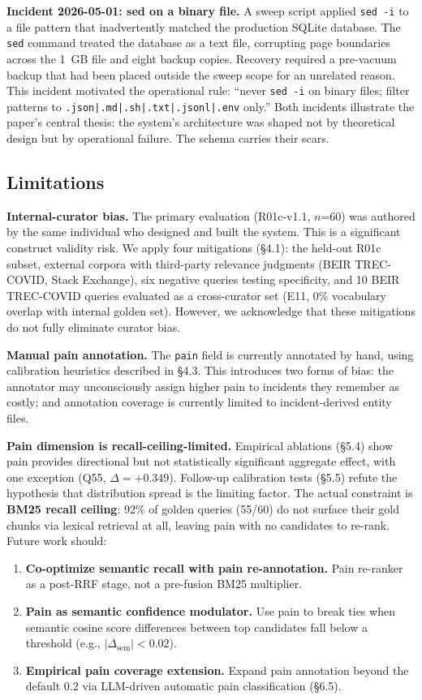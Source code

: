 \textbf{Incident 2026-05-01: sed on a binary file.} A sweep script applied
\texttt{sed~-i} to a file pattern that inadvertently matched the production SQLite
database. The \texttt{sed} command treated the database as a text file, corrupting page
boundaries across the 1~GB file and eight backup copies. Recovery required a pre-vacuum
backup that had been placed outside the sweep scope for an unrelated reason. This incident
motivated the operational rule: ``never \texttt{sed~-i} on binary files; filter patterns
to \texttt{.json|.md|.sh|.txt|.jsonl|.env} only.'' Both incidents illustrate the paper's
central thesis: the system's architecture was shaped not by theoretical design but by
operational failure. The schema carries their scars.

\subsection{Limitations}

\textbf{Internal-curator bias.} The primary evaluation (R01c-v1.1, $n$=60) was authored by the
same individual who designed and built the system. This is a significant construct validity
risk. We apply four mitigations (\S4.1): the held-out R01c subset, external corpora with
third-party relevance judgments (BEIR TREC-COVID, Stack Exchange), six negative queries
testing specificity, and 10 BEIR TREC-COVID queries evaluated as a cross-curator set (E11,
0\% vocabulary overlap with internal golden set). However, we acknowledge that these
mitigations do not fully eliminate curator bias.

\textbf{Manual pain annotation.} The \texttt{pain} field is currently annotated by hand,
using calibration heuristics described in \S4.3. This introduces two forms of bias: the
annotator may unconsciously assign higher pain to incidents they remember as costly; and
annotation coverage is currently limited to incident-derived entity files.

\textbf{Pain dimension is recall-ceiling-limited.} Empirical ablations (\S5.4) show pain
provides directional but not statistically significant aggregate effect, with one exception
(Q55, $\Delta=+0.349$). Follow-up calibration tests (\S5.5) refute the hypothesis that
distribution spread is the limiting factor. The actual constraint is \textbf{BM25 recall
ceiling}: 92\% of golden queries (55/60) do not surface their gold chunks via lexical
retrieval at all, leaving pain with no candidates to re-rank. Future work should:

\begin{enumerate}
  \item \textbf{Co-optimize semantic recall with pain re-annotation.} Pain re-ranker as a
    post-RRF stage, not a pre-fusion BM25 multiplier.
  \item \textbf{Pain as semantic confidence modulator.} Use pain to break ties when
    semantic cosine score differences between top candidates fall below a threshold
    (e.g., $|\Delta_\text{sem}| < 0.02$).
  \item \textbf{Empirical pain coverage extension.} Expand pain annotation beyond the
    default 0.2 via LLM-driven automatic pain classification (\S6.5).
\end{enumerate}

